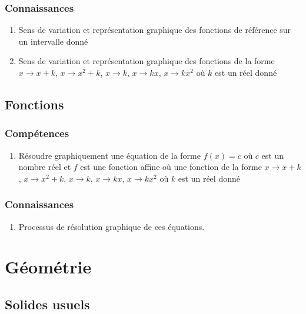 \documentclass[12pt,a4paper]{article}
\begin{document}
	\subsubsection*{Connaissances}
	\begin{enumerate}
		\item Sens de variation et représentation graphique des fonctions de référence sur un intervalle donné
		\item Sens de variation et représentation graphique des fonctions de la forme $x \rightarrow x+k$, $x \rightarrow x^2+k$, $x \rightarrow k$, $x \rightarrow kx$, $x \rightarrow kx^2$ où $k$ est un réel donné
	\end{enumerate}


\subsection{Fonctions}


	\subsubsection*{Compétences}
	\begin{enumerate}
		\item Résoudre graphiquement une équation de la forme $f(x)=c$ où $c$ est un nombre réel et $f$ est une fonction affine où une fonction de la forme $x \rightarrow x+k$, $x \rightarrow x^2+k$, $x \rightarrow k$, $x \rightarrow kx$, $x \rightarrow kx^2$ où $k$ est un réel donné
	\end{enumerate}
	
	\subsubsection*{Connaissances}
	\begin{enumerate}
		\item Processus de résolution graphique de ces équations.

	\end{enumerate}

\section{Géométrie}

\subsection{Solides usuels}
\end{document}
